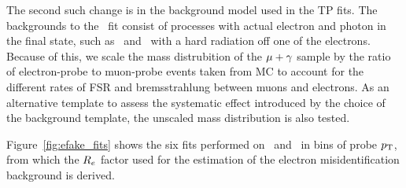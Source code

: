 The second such change is in the background model used in the TP fits. 
The backgrounds to the \Pe\Pgg\ fit consist of processes with actual electron and photon in the final state, such as \PW\Pgg\ and \Zee\ with a hard radiation off one of the electrons.
Because of this, we scale the mass distrubition of the ${\mu}+\gamma$ sample by the ratio of electron-probe to muon-probe events taken from MC to account for the different rates of FSR and bremsstrahlung between muons and electrons.
As an alternative template to assess the systematic effect introduced by the choice of the background template, the unscaled mass distribution is also tested.

Figure~\ref{fig:efake_fits} shows the six fits performed on \Pe\Pe\ and \Pe\Pgg\ in bins of probe $p_{\mathrm{T}}$, from which the $R_{{e}}$ factor used for the estimation of the electron misidentification background is derived. 

